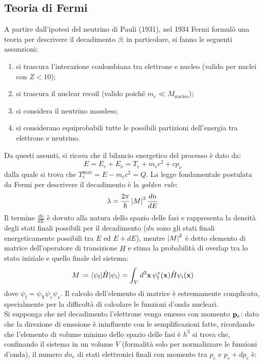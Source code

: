\subsection{Teoria di Fermi}\label{fermi-th-sec}

A partire dall'ipotesi del neutrino di Pauli (1931), nel 1934 Fermi formulò una teoria per descrivere il decadimento $ \beta $; in particolare, si fanno le seguenti assunzioni:
\begin{enumerate}
	\item si trascura l'interazione coulombiana tra elettrone e nucleo (valido per nuclei con $ Z < 10 $);
	\item si trascura il nuclear recoil (valido poiché $ m_e \ll M_{\text{nucleo}} $);
	\item si considera il neutrino massless;
	\item si considerano equiprobabili tutte le possibili partizioni dell'energia tra elettrone e neutrino.
\end{enumerate}
Da questi assunti, si ricava che il bilancio energetico del processo è dato da:
\begin{equation}
	E = E_e + E_{\nu} = T_e + m_e c^2 + c p_{\nu}
	\label{eq:2.23}
\end{equation}
dalla quale si trova che $ T_e^{\text{max}} = E - m_e c^2 = Q $. La legge fondamentale postulata da Fermi per descrivere il decadimento è la \textit{golden rule}:
\begin{equation}
	\lambda = \frac{2\pi}{\hbar} \left\lvert M\right\rvert^2 \frac{dn}{dE}
	\label{eq:2.24}
\end{equation}
Il termine $ \frac{dn}{dE} $ è dovuto alla natura dello spazio delle fasi e rappresenta la densità degli stati finali possibili per il decadimento ($ dn $ sono gli stati finali energeticamente possibili tra $ E $ ed $ E + dE $), mentre $ \left\lvert M\right\rvert^2 $ è detto elemento di matrice dell'operatore di transizione $ \hat{H} $ e stima la probabilità di overlap tra lo stato iniziale e quello finale del sistema:
\begin{equation}
	M \defeq \braket{\psi_{\text{f}} | \hat{H} | \psi_{\text{i}}} = \int_V d^3\ve{x}\, \psi^*_{\text{f}}(\ve{x}) \hat{H} \psi_{\text{i}}(\ve{x})
	\label{eq:2.25}
\end{equation}
dove $ \psi_{\text{f}} = \psi_{\text{Y}} \psi_e \psi_{\nu} $. Il calcolo dell'elemento di matrice è estremamente complicato, specialmente per la difficoltà di calcolare le funzioni d'onda nucleari.\\
Si supponga che nel decadimento l'elettrone venga emesso con momento $ \mathbf{p}_e $: dato che la direzione di emssione è ininfluente con le semplificazioni fatte, ricordando che l'elemento di volume minimo dello spazio delle fasi è $ h^3 $ si trova che, confinando il sistema in un volume $ V $ (formalità solo per normalizzare le funzioni d'onda), il numero $ dn_e $ di stati elettronici finali con momento tra $ p_e $ e $ p_e + dp_e $ è:
